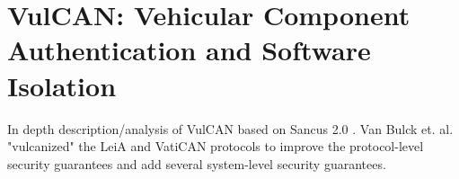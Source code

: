 
\section{VulCAN: Vehicular Component Authentication and Software Isolation}
\label{sec:technique-in-depth}

In depth description/analysis of VulCAN \cite{VanBulck2017} based on Sancus 2.0
\cite{Noorman}. Van Bulck et. al. "vulcanized" the LeiA and VatiCAN protocols to
improve the protocol-level security guarantees and add several system-level
security guarantees.
